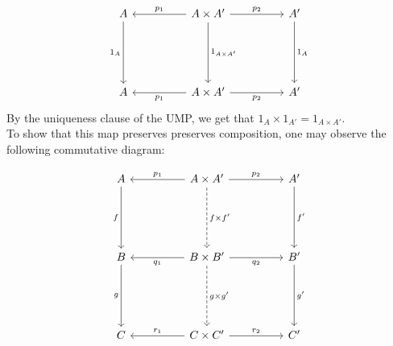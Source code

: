 \documentclass[11pt,leqno,landscape,semhelv]{seminar}
\numberwithin{equation}{section}
\theoremstyle{definition}
\numberwithin{thm}{section}
\numberwithin{equation}{section}
\begin{document}
\begin{equation*} 
	\begin{tikzcd}
	A \arrow[ddd, "1_A"'] &  & A \times A' \arrow[ll, "p_1"'] \arrow[rr, "p_2"] \arrow[ddd, "1_{A \times A'}"] &  & A' \arrow[ddd, "1_A"] \\&&&&\\&&&&\\
	A &  & A\times A' \arrow[ll, "p_1"]\arrow[rr, "p_2"']&&A'                  
	\end{tikzcd}
\end{equation*}	
By the uniqueness clause of the UMP, we get that $1_A \times 1_{A'} = 1_{A\times A'}.$\\
To show that this map preserves preserves composition, one may observe the following commutative diagram:

\begin{equation*} 
	\begin{tikzcd}
A \arrow[ddd, "f"'] &  & A \times A' \arrow[ll, "p_1"'] \arrow[rr, "p_2"] \arrow[ddd, "f\times f'", dashed] &  & A' \arrow[ddd, "f'"] \\
                    &  &                                                                                    &  &                      \\
                    &  &                                                                                    &  &                      \\
B \arrow[ddd, "g"'] &  & B\times B' \arrow[ll, "q_1"] \arrow[rr, "q_2"'] \arrow[ddd, "g\times g'", dashed]  &  & B' \arrow[ddd, "g'"] \\
                    &  &                                                                                    &  &                      \\
                    &  &                                                                                    &  &                      \\
C                   &  & C\times C' \arrow[ll, "r_1"'] \arrow[rr, "r_2"]                                    &  & C'                  
\end{tikzcd}
\end{equation*}
\end{document}
